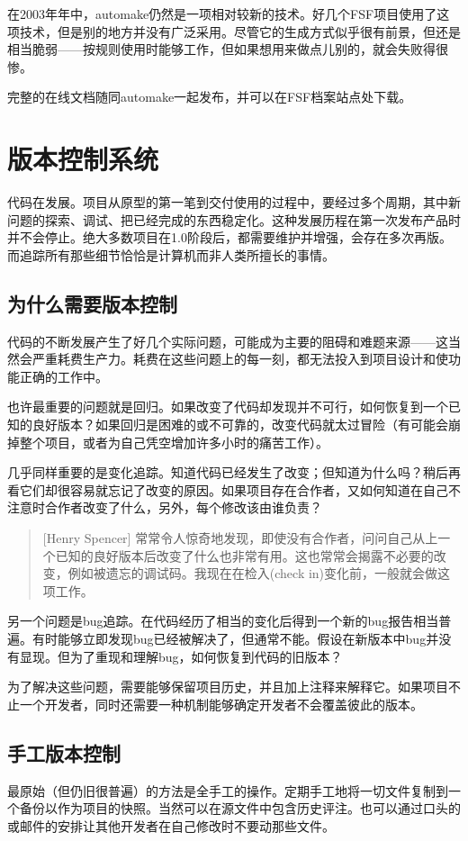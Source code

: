 \documentclass[12pt,oneside]{book}
\begin{document}
在2003年年中，automake仍然是一项相对较新的技术。好几个FSF项目使用了这项技术，但是别的地方并没有广泛采用。尽管它的生成方式似乎很有前景，但还是相当脆弱——按规则使用时能够工作，但如果想用来做点儿别的，就会失败得很惨。

完整的在线文档随同automake一起发布，并可以在FSF档案站点处下载。

\section{版本控制系统}
代码在发展。项目从原型的第一笔到交付使用的过程中，要经过多个周期，其中新问题的探索、调试、把已经完成的东西稳定化。这种发展历程在第一次发布产品时并不会停止。绝大多数项目在1.0阶段后，都需要维护并增强，会存在多次再版。而追踪所有那些细节恰恰是计算机而非人类所擅长的事情。

\subsection{为什么需要版本控制}
代码的不断发展产生了好几个实际问题，可能成为主要的阻碍和难题来源——这当然会严重耗费生产力。耗费在这些问题上的每一刻，都无法投入到项目设计和使功能正确的工作中。

也许最重要的问题就是回归。如果改变了代码却发现并不可行，如何恢复到一个已知的良好版本？如果回归是困难的或不可靠的，改变代码就太过冒险（有可能会崩掉整个项目，或者为自己凭空增加许多小时的痛苦工作）。

几乎同样重要的是变化追踪。知道代码已经发生了改变；但知道为什么吗？稍后再看它们却很容易就忘记了改变的原因。如果项目存在合作者，又如何知道在自己不注意时合作者改变了什么，另外，每个修改该由谁负责？

\begin{quote}[Henry Spencer]
常常令人惊奇地发现，即使没有合作者，问问自己从上一个已知的良好版本后改变了什么也非常有用。这也常常会揭露不必要的改变，例如被遗忘的调试码。我现在在检入(check in)变化前，一般就会做这项工作。
\end{quote}

另一个问题是bug追踪。在代码经历了相当的变化后得到一个新的bug报告相当普遍。有时能够立即发现bug已经被解决了，但通常不能。假设在新版本中bug并没有显现。但为了重现和理解bug，如何恢复到代码的旧版本？

为了解决这些问题，需要能够保留项目历史，并且加上注释来解释它。如果项目不止一个开发者，同时还需要一种机制能够确定开发者不会覆盖彼此的版本。

\subsection{手工版本控制}
最原始（但仍旧很普遍）的方法是全手工的操作。定期手工地将一切文件复制到一个备份以作为项目的快照。当然可以在源文件中包含历史评注。也可以通过口头的或邮件的安排让其他开发者在自己修改时不要动那些文件。
\end{document}
